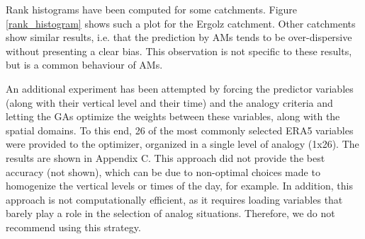\documentclass[draft]{agujournal2019}
\begin{document}
Rank histograms have been computed for some catchments. Figure \ref{rank_histogram} shows such a plot for the Ergolz catchment. Other catchments show similar results, i.e. that the prediction by AMs tends to be over-dispersive without presenting a clear bias. This observation is not specific to these results, but is a common behaviour of AMs. 

An additional experiment has been attempted by forcing the predictor variables (along with their vertical level and their time) and the analogy criteria and letting the GAs optimize the weights between these variables, along with the spatial domains. To this end, 26 of the most commonly selected ERA5 variables were provided to the optimizer, organized in a single level of analogy (1x26). The results are shown in Appendix C. This approach did not provide the best accuracy (not shown), which can be due to non-optimal choices made to homogenize the vertical levels or times of the day, for example. In addition, this approach is not computationally efficient, as it requires loading variables that barely play a role in the selection of analog situations. Therefore, we do not recommend using this strategy.
\end{document}
